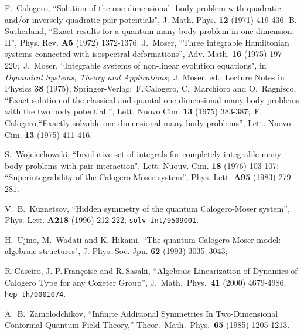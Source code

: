 \documentclass[a4paper,12pt]{article}
\begin{document}
\begin{thebibliography}{99}
  F.\, Calogero, ``Solution of the one-dimensional
\coordHE{}-body problem with quadratic and/or inversely quadratic pair
potentials", J. Math. Phys. {\bf 12} (1971) 419-436.
B.\, Sutherland, ``Exact results for a quantum many-body problem in
one-dimension. II'', Phys. Rev. {\bf A5} (1972) 1372-1376.
J.\, Moser, ``Three integrable Hamiltonian systems connected with
isospectral deformations'',  Adv. Math. {\bf 16} (1975) 197-220;\
J.\, Moser,  ``Integrable systems of non-linear evolution equations",
in {\it Dynamical Systems, Theory and Applications\/};\
J. Moser, ed., Lecture Notes in Physics {\bf 38} (1975),
Springer-Verlag;\
F.\,Calogero, C.\, Marchioro and O.\, Ragnisco, ``Exact solution of the
classical and quantal one-dimensional many body problems with
the two body potential \coordHE{}'', Lett. Nuovo
Cim. {\bf 13} (1975) 383-387;\
F.\,Calogero,``Exactly solvable one-dimensional many body problems'',
Lett. Nuovo Cim. {\bf 13} (1975) 411-416.

\bibitem{Woj}
S.\, Wojciechowski, ``Involutive set of integrals for completely
integrable many-body problems with pair interaction",
Lett. Nuouv. Cim. {\bf 18} (1976) 103-107;
``Superintegrability of the Calogero-Moser system'',
Phys. Lett. {\bf A95} (1983) 279-281.


\bibitem{Kuz}
V.~B.~Kuznetsov,
``Hidden symmetry of the quantum Calogero-Moser system'',
Phys. Lett. {\bf A218} (1996) 212-222, {\tt solv-int/9509001}.

\bibitem{UjWa}
 H.\, Ujino,  M.\, Wadati and K. Hikami, ``The quantum Calogero-Moser
model: algebraic structures", J. Phys. Soc. Jpn.
 {\bf 62} (1993) 3035--3043;




R.\,Caseiro, J.-P.\,Fran\c{c}oise and R.\,Sasaki,
``Algebraic Linearization of Dynamics of Calogero Type for any
Coxeter Group'',
J.\ Math.\ Phys.\ {\bf 41} (2000) 4679-4986,
{\tt hep-th/0001074}.


A.~B.~Zamolodchikov,
``Infinite Additional Symmetries In Two-Dimensional
Conformal Quantum Field
Theory,''
Theor.\ Math.\ Phys.\ {\bf 65} (1985) 1205-1213.



\end{thebibliography}
\end{document}
